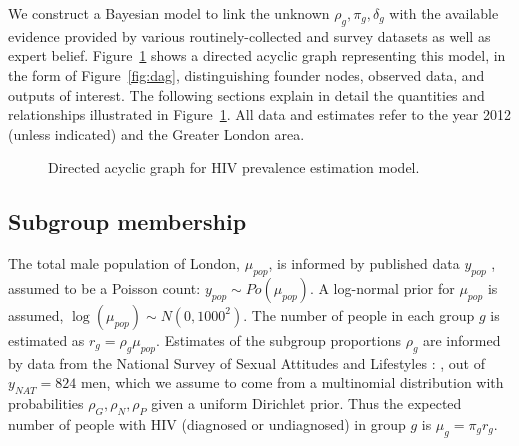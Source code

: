 \documentclass[12pt]{article}\usepackage[]{graphicx}\usepackage[]{color}
\begin{document}
We construct a Bayesian model to link the unknown $\rho_g,\pi_g,\delta_g$ with the available evidence provided by various routinely-collected and survey datasets as well as expert belief.  Figure~\ref{fig:hiv:dag} shows a directed acyclic graph representing this model, in the form of Figure~\ref{fig:dag}, distinguishing founder nodes, observed data, and outputs of interest.  The following sections explain in detail the quantities and relationships illustrated in Figure~\ref{fig:hiv:dag}.   All data and estimates refer to the year 2012 (unless indicated) and the Greater London area.  

\begin{figure}[p]
  \centering
\caption{\label{fig:hiv:dag}Directed acyclic graph for HIV prevalence estimation model.}
\end{figure}






\subsection{Subgroup membership}
\label{sec:natsal}
The total male population of London, $\mu_{pop}$, is informed by published data $y_{pop}$ \citep{ONS2012}, assumed to be a Poisson count: $y_{pop} \sim Po(\mu_{pop})$.   A log-normal prior for $\mu_{pop}$ is assumed, $\log(\mu_{pop}) \sim N(0,1000^2)$.  The number of people in each group $g$ is estimated as $r_g = \rho_g \mu_{pop}$. Estimates of the subgroup proportions $\rho_g$ are informed by data from the National Survey of Sexual Attitudes and Lifestyles \citep{NATSAL3}: \iftoggle{nodata}{$y_G, y_N, y_P$}{$y_G=7$, $y_N=38,y_P=10$}, out of $y_{NAT}=824$ men, which we assume to come from a multinomial distribution with probabilities $\rho_G,\rho_N,\rho_P$ given a uniform Dirichlet prior.  Thus the expected number of people with HIV (diagnosed or undiagnosed) in group $g$ is $\mu_g = \pi_g r_g$.
\end{document}
